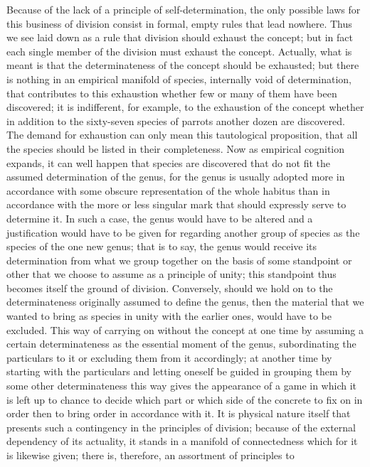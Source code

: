 Because of the lack of a principle of self-determination, the only possible
laws for this business of division consist in formal, empty rules that lead
nowhere.
Thus we see laid down as a rule that division should exhaust the
concept; but in fact each single member of the division must exhaust the
concept. Actually, what is meant is that the determinateness of the concept
should be exhausted; but there is nothing in an empirical manifold of
species, internally void of determination, that contributes to this exhaustion
whether few or many of them have been discovered; it is indifferent, for
example, to the exhaustion of the concept whether in addition to the
sixty-seven species of parrots another dozen are discovered. The demand
for exhaustion can only mean this tautological proposition, that all the
species should be listed in their completeness.
Now as empirical cognition
expands, it can well happen that species are discovered that do not fit the
assumed determination of the genus, for the genus is usually adopted more
in accordance with some obscure representation of the whole habitus than
in accordance with the more or less singular mark that should expressly
serve to determine it.
In such a case, the genus would have to be altered
and a justification would have to be given for regarding another group of
species as the species of the one new genus; that is to say, the genus would
receive its determination from what we group together on the basis of
some standpoint or other that we choose to assume as a principle of unity;
this standpoint thus becomes itself the ground of division. Conversely,
should we hold on to the determinateness originally assumed to define the
genus, then the material that we wanted to bring as species in unity with the
earlier ones, would have to be excluded. This way of carrying on without the
concept
at one time by assuming a certain determinateness as the essential
moment of the genus, subordinating the particulars to it or excluding them
from it accordingly; at another time by starting with the particulars and
letting oneself be guided in grouping them by some other determinateness
this way gives the appearance of a game in which it is left up to chance to
decide which part or which side of the concrete to fix on in order then to
bring order in accordance with it.
It is physical nature itself that presents
such a contingency in the principles of division; because of the external
dependency of its actuality, it stands in a manifold of connectedness which
for it is likewise given; there is, therefore, an assortment of principles to

